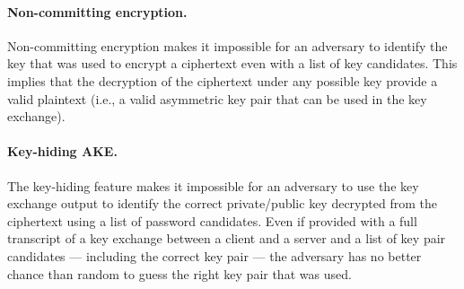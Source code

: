 ﻿\documentclass[../report.tex]{subfiles}
\begin{document}
\paragraph{Non-committing encryption.}  \label{sec:non_committing_encryption}
Non-committing encryption makes it impossible for an adversary to identify the key that was used to encrypt a ciphertext even with a list of key candidates. This implies that the decryption of the ciphertext under any possible key provide a valid plaintext (i.e., a valid asymmetric key pair that can be used in the key exchange).


\paragraph{Key-hiding AKE.}  \label{sec:key_hiding_ake}
The key-hiding feature makes it impossible for an adversary to use the key exchange output to identify the correct private/public key decrypted from the ciphertext using a list of password candidates.
Even if provided with a full transcript of a key exchange between a client and a server and a list of key pair candidates --- including the correct key pair --- the adversary has no better chance than random to guess the right key pair that was used.


% 
% 


\paragraph{}
\end{document}
